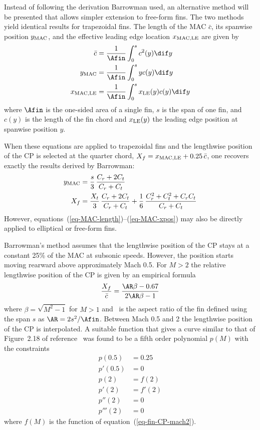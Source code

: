 Instead of following the derivation Barrowman used, an alternative
method will be presented that allows simpler extension to free-form
fins.  The two methods yield identical results for trapezoidal fins.
The length of the MAC $\bar c$, its spanwise position $y_{\rm MAC}$,
and the effective leading edge location $x_{\rm MAC,LE}$ are given
by~\cite{appl-comp-aero-fins}
%
\begin{align}
\bar c &=  \frac{1}{\Afin} \int_0^s c^2(y) \dif y
   \label{eq-MAC-length} \\
y_{\rm MAC} &= \frac{1}{\Afin} \int_0^s yc(y) \dif y 
   \label{eq-MAC-ypos} \\
x_{\rm MAC,LE} &= \frac{1}{\Afin} \int_0^s x_{\rm LE}(y)c(y) \dif y
   \label{eq-MAC-xpos}
\end{align}
%
where $\Afin$ is the one-sided area of a single fin, $s$ is the span of
one fin, and $c(y)$ is the length of the fin chord and $x_{\rm LE}(y)$
the leading edge position at spanwise position $y$.

When these equations are applied to trapezoidal fins and the
lengthwise position of the CP is selected at the quarter chord,
$X_f=x_{\rm MAC,LE}+0.25\,\bar c$,
one recovers exactly the results derived by Barrowman:
%
\begin{align}
y_{\rm MAC} &= \frac{s}{3}\,\frac{C_r+2C_t}{C_r+C_t} \\
X_f &= \frac{X_t}{3}\,\frac{C_r+2C_t}{C_r+C_t} +
          \frac{1}{6}\,\frac{C_r^2+C_t^2+C_rC_t}{C_r+C_t}
\end{align}
%
However, equations~(\ref{eq-MAC-length})--(\ref{eq-MAC-xpos}) may also
be directly applied to elliptical or free-form fins.

Barrowman's method assumes that the lengthwise position of the CP
stays at a constant 25\% of the MAC at subsonic speeds.  However, the
position starts moving rearward above approximately Mach 0.5.  For
$M>2$ the relative lengthwise position of the CP is given by an empirical
formula~\cite[p.~33]{fleeman}
%
\begin{equation}
\frac{X_f}{\bar c} = \frac{\AR\beta - 0.67}{2\AR\beta-1}
\label{eq-fin-CP-mach2}
\end{equation}
%
where $\beta=\sqrt{M^2-1}$ for $M>1$ and \AR\ is the aspect ratio of
the fin defined using the span $s$ as $\AR=2s^2/\Afin$. 
%
Between Mach 0.5 and 2 the lengthwise position of the CP is
interpolated.  A suitable function that gives a curve similar to that
of Figure~2.18 of reference~\cite[p.~33]{fleeman} was found to be a
fifth order polynomial $p(M)$ with the constraints
%
\begin{equation}
  \begin{split}
p(0.5)   & =  0.25 \\
p'(0.5)  & =  0 \\
p(2)     & =  f(2)  \\
p'(2)    & =  f'(2) \\
p''(2)   & =  0 \\
p'''(2)  & =  0
  \end{split}
\end{equation}
%
where $f(M)$ is the function of equation~(\ref{eq-fin-CP-mach2}).




